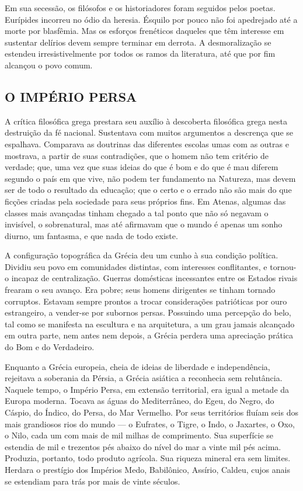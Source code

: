 \documentclass[11pt,a5paper,twoside,openany]{book}
\begin{document}
Em sua secessão, os filósofos e os historiadores foram seguidos pelos poetas. Eurípides incorreu no ódio da heresia. Ésquilo por pouco não foi apedrejado até a morte por blasfêmia. Mas os esforços frenéticos daqueles que têm interesse em sustentar delírios devem sempre terminar em derrota. A desmoralização se estendeu irresistivelmente por todos os ramos da literatura, até que por fim alcançou o povo comum.

\subsection*{O IMPÉRIO PERSA}
A crítica filosófica grega prestara seu auxílio à descoberta filosófica grega nesta destruição da fé nacional. Sustentava com muitos argumentos a descrença que se espalhava. Comparava as doutrinas das diferentes escolas umas com as outras e mostrava, a partir de suas contradições, que o homem não tem critério de verdade; que, uma vez que suas ideias do que é bom e do que é mau diferem segundo o país em que vive, não podem ter fundamento na Natureza, mas devem ser de todo o resultado da educação; que o certo e o errado não são mais do que ficções criadas pela sociedade para seus próprios fins. Em Atenas, algumas das classes mais avançadas tinham chegado a tal ponto que não só negavam o invisível, o sobrenatural, mas até afirmavam que o mundo é apenas um sonho diurno, um fantasma, e que nada de todo existe.

A configuração topográfica da Grécia deu um cunho à sua condição política. Dividiu seu povo em comunidades distintas, com interesses conflitantes, e tornou-o incapaz de centralização. Guerras domésticas incessantes entre os Estados rivais frearam o seu avanço. Era pobre; seus homens dirigentes se tinham tornado corruptos. Estavam sempre prontos a trocar considerações patrióticas por ouro estrangeiro, a vender-se por subornos persas. Possuindo uma percepção do belo, tal como se manifesta na escultura e na arquitetura, a um grau jamais alcançado em outra parte, nem antes nem depois, a Grécia perdera uma apreciação prática do Bom e do Verdadeiro.

Enquanto a Grécia europeia, cheia de ideias de liberdade e independência, rejeitava a soberania da Pérsia, a Grécia asiática a reconhecia sem relutância. Naquele tempo, o Império Persa, em extensão territorial, era igual a metade da Europa moderna. Tocava as águas do Mediterrâneo, do Egeu, do Negro, do Cáspio, do Índico, do Persa, do Mar Vermelho. Por seus territórios fluíam seis dos mais grandiosos rios do mundo — o Eufrates, o Tigre, o Indo, o Jaxartes, o Oxo, o Nilo, cada um com mais de mil milhas de comprimento. Sua superfície se estendia de mil e trezentos pés abaixo do nível do mar a vinte mil pés acima. Produzia, portanto, todo produto agrícola. Sua riqueza mineral era sem limites. Herdara o prestígio dos Impérios Medo, Babilônico, Assírio, Caldeu, cujos anais se estendiam para trás por mais de vinte séculos.
\end{document}
